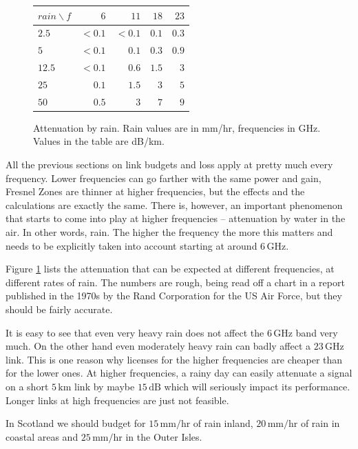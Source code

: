 \begin{figure}[h]
  \begin{center}
    \begin{tabular}{l|rrrr}
      $rain\backslash f$ & $6$ & $11$ & $18$ & $23$ \\
      \hline
      $2.5$ & $< 0.1$ & $< 0.1$ & $0.1$ & $0.3$\\
      $5$   & $< 0.1$ & $0.1$ & $0.3$ & $0.9$\\ 
      $12.5$ & $< 0.1$ & $0.6$ & $1.5$ & $3$\\
      $25$ & $0.1$ & $1.5$ & $3$ & $5$\\
      $50$ & $0.5$ & $3$ & $7$ & $9$\\
    \end{tabular}
  \end{center}
  \caption{Attenuation by rain. Rain values are in mm/hr, frequencies
    in GHz. Values in the table are dB/km.}
  \label{fig:rain_fade}
\end{figure}

All the previous sections on link budgets and loss apply at pretty
much every frequency. Lower frequencies can go farther with the same
power and gain, Fresnel Zones are thinner at higher frequencies, but
the effects and the calculations are exactly the same. There is,
however, an important phenomenon that starts to come into play at
higher frequencies -- attenuation by water in the air. In other words,
rain. The higher the frequency the more this matters and needs to be
explicitly taken into account starting at around $6\, \mathrm{GHz}$. 

Figure \ref{fig:rain_fade} lists the attenuation that can be expected
at different frequencies, at different rates of rain.  The numbers are
rough, being read off a chart in a report published in the 1970s by
the Rand Corporation for the US Air Force, but they should be fairly
accurate.


It is easy to see that even very heavy rain does not affect the
$6\,\mathrm{GHz}$ band very much. On the other hand even moderately
heavy rain can badly affect a $23\, \mathrm{GHz}$ link. This is one
reason why licenses for the higher frequencies are cheaper than for
the lower ones. At higher frequencies, a rainy day can easily
attenuate a signal on a short $5\, \mathrm{km}$ link by maybe $15\,
\mathrm{dB}$ which will seriously impact its performance. Longer links
at high frequencies are just not feasible.

In Scotland we should budget for $15\, \mathrm{mm/hr}$ of rain inland,
$20\, \mathrm{mm/hr}$ of rain in coastal areas and $25\,\mathrm{mm/hr}$
in the Outer Isles.

